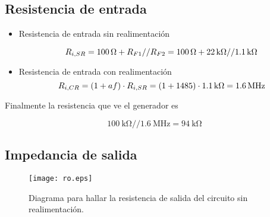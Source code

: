 \subsection{Resistencia de entrada}

\begin{itemize}
	
		
	\item Resistencia de entrada sin realimentación
	
	\begin{equation}
		\centering
		R_{i,SR} = \SI{100}{\ohm} + R_{F1}//R_{F2} = \SI{100}{\ohm} + \SI{22}{\kilo\ohm}//\SI{1.1}{\kilo\ohm}
	\end{equation}
	
	\item Resistencia de entrada con realimentación
	\begin{equation}
		\centering
		R_{i,CR} = (1+ af) \cdot R_{i,SR} = (1 + 1485) \cdot \SI{1.1}{\kilo\ohm} = \SI{1.6}{\mega\hertz}
	\end{equation}
	
\end{itemize}

Finalmente la resistencia que ve el generador es

$$ \SI{100}{\kilo\ohm}//\SI{1.6}{\mega\hertz} = \boxed{\SI{94}{\kilo\ohm}} $$


\subsection{Impedancia de salida}

\begin{figure}[H]
	 \centering
	 \texttt{[image: ro.eps]}
	 \caption{Diagrama para hallar la resistencia de salida del circuito sin realimentación.}
\end{figure}

